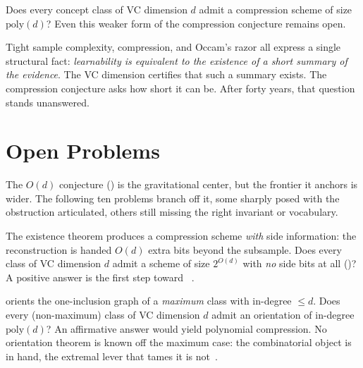 \begin{openprob}
\label{op:poly-compression}
Does every concept class of VC dimension $d$ admit a compression scheme of
size $\mathrm{poly}(d)$?  Even this weaker form of the compression conjecture
remains open.
\end{openprob}

Tight sample complexity, compression, and Occam's razor all express a single
structural fact: \emph{learnability is equivalent to the existence of a short
summary of the evidence}.  The VC dimension certifies that such a summary
exists.  The compression conjecture asks how short it can be.  After forty
years, that question stands unanswered.



\section{Open Problems}
\label{sec:compression-open}

The $O(d)$ conjecture () is the gravitational center, but
the frontier it anchors is wider.  The following ten problems branch off it,
some sharply posed with the obstruction articulated, others still missing the
right invariant or vocabulary.

\begin{openprob}
\label{op:side-info}
The existence theorem produces a compression scheme \emph{with} side
information: the reconstruction is handed $O(d)$ extra bits beyond the subsample.
Does every class of VC dimension $d$ admit a scheme of size $2^{O(d)}$ with
\emph{no} side bits at all ()?  A
positive answer is the first step toward
~\cite{MoranYehudayoff2016}.
\end{openprob}

\begin{openprob}
\label{op:oig-orientation}
 orients the one-inclusion graph of a
\emph{maximum} class with in-degree $\leq d$.  Does every (non-maximum) class of
VC dimension $d$ admit an orientation of in-degree $\mathrm{poly}(d)$?  An
affirmative answer would yield polynomial compression.  No orientation theorem
is known off the maximum case: the combinatorial object is in hand, the extremal
lever that tames it is not~\cite{KuzminWarmuth2007}.
\end{openprob}

